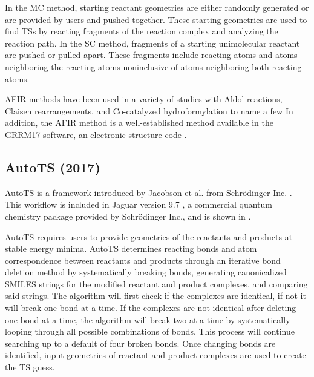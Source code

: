 \documentclass[preprint, 11pt]{elsarticle} %
\begin{document}
In the MC method, starting reactant geometries are either randomly generated or are provided by users and pushed together.
These starting geometries are used to find TSs by reacting fragments of the reaction complex and analyzing the reaction path.
In the SC method, fragments of a starting unimolecular reactant are pushed or pulled apart. 
These fragments include reacting atoms and atoms neighboring the reacting atoms noninclusive of atoms neighboring both reacting atoms.

AFIR methods have been used in a variety of studies \cite{Maeda:2016, Madea:2018} with Aldol reactions, Claisen rearrangements, and Co-catalyzed hydroformylation to name a few \cite{Maeda:2016}
In addition, the AFIR method is a well-established method available in the GRRM17 software, an electronic structure code \cite{Madea:2013}.



\subsection{AutoTS (2017)}

AutoTS is a framework introduced by Jacobson et al. from Schr\"{o}dinger Inc. \cite{jacobson:2017}. 
This workflow is included in Jaguar version 9.7 \cite{Jaguar:2013},  a commercial quantum chemistry package provided by Schr\"{o}dinger Inc., and is shown in .

AutoTS requires users to provide geometries of the reactants and products at stable energy minima.
AutoTS determines reacting bonds and atom correspondence between reactants and products through an iterative bond deletion method by systematically breaking bonds, generating canonicalized SMILES strings for the modified reactant and product complexes, and comparing said strings.
The algorithm will first check if the complexes are identical, if not it will break one bond at a time.
If the complexes are not identical after deleting one bond at a time, the algorithm will break two at a time by systematically looping through all possible combinations of bonds.
This process will continue searching up to a default of four broken bonds.
Once changing bonds are identified, input geometries of reactant and product complexes are used to create the TS guess.
\end{document}
